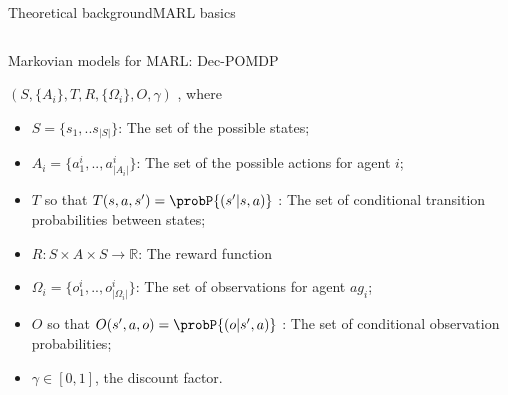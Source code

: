 \begin{frame}{Theoretical background}{MARL basics}
\begin{columns}
\begin{column}{0.7\textwidth}
\begin{block}{Markovian models for MARL: Dec-POMDP}
                \

                { \scriptsize

                $(S,\{A_i\},T,R,\{\Omega_i\},O,\gamma)$ , where
                \begin{itemize}
                    \item $S = \{s_1, ..s_{|S|}\}$: The set of the possible states;
                    \item $A_{i} = \{a_{1}^{i},..,a_{|A_{i}|}^{i}\}$: The set of the possible actions for agent $i$;
                    \item $T$ so that $T(s,a,s') = \probP{(s'|s,a)}$ : The set of conditional transition probabilities between states;
                    \item $R: S \times A \times S \rightarrow \mathbb{R}$: The reward function
                    \item $\Omega_{i} = \{o_{1}^{i},..,o_{|\Omega_{i}|}^{i}\}$: The set of observations for agent $ag_i$;
                    \item $O$ so that $O(s',a,o) = \probP{(o|s',a)}$ : The set of conditional observation probabilities;
                    \item $\gamma \in [0,1]$, the discount factor.
                \end{itemize}

                }

            \end{block}

        \end{column}

    \end{columns}

\end{frame}

